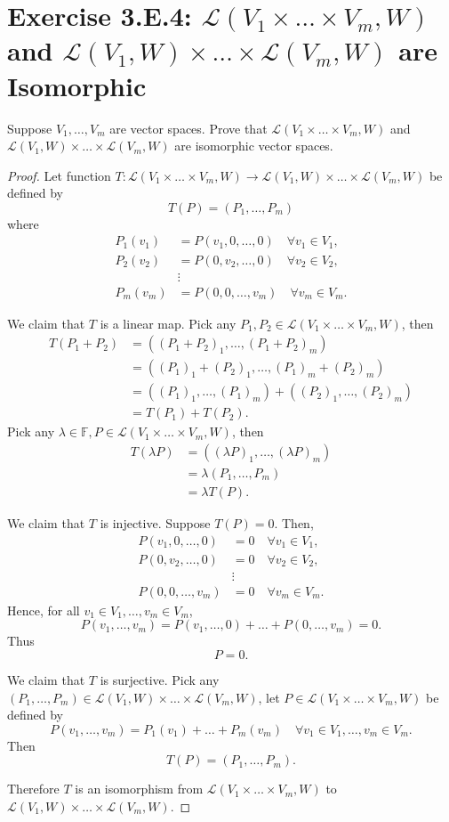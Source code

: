 \section{Exercise 3.E.4: $\mathcal{L}(V_1\times\dots\times V_m,W)$ and $\mathcal{L}(V_1, W)\times\dots\times\mathcal{L}(V_m,W)$ are Isomorphic}
Suppose $V_1,\dots,V_m$ are vector spaces. Prove that $\mathcal{L}(V_1\times\dots\times V_m,W)$ and $\mathcal{L}(V_1, W)\times\dots\times\mathcal{L}(V_m,W)$ are isomorphic vector spaces.
\begin{proof}
Let function $T:\mathcal{L}(V_1\times\dots\times V_m,W)\to\mathcal{L}(V_1, W)\times\dots\times\mathcal{L}(V_m,W)$ be defined by\[
T(P)=(P_1,\dots,P_m)
\]where\[
\begin{split}
P_1(v_1)&=P(v_1,0,\dots,0)\quad\forall v_1\in V_1,\\
P_2(v_2)&=P(0,v_2,\dots,0)\quad\forall v_2\in V_2,\\
&\vdots\\
P_m(v_m)&=P(0,0,\dots,v_m)\quad\forall v_m\in V_m.
\end{split}
\]

We claim that $T$ is a linear map. Pick any $P_1,P_2\in\mathcal{L}(V_1\times\dots\times V_m,W)$, then\[
\begin{split}
T(P_1+P_2)&=((P_1+P_2)_1,\dots,(P_1+P_2)_m)\\
&=((P_1)_1+(P_2)_1,\dots,(P_1)_m+(P_2)_m)\\
&=((P_1)_1,\dots,(P_1)_m) + ((P_2)_1,\dots,(P_2)_m)\\
&=T(P_1)+T(P_2).
\end{split}
\]Pick any $\lambda\in\mathbb{F}, P\in\mathcal{L}(V_1\times\dots\times V_m,W)$, then\[
\begin{split}
T(\lambda P)&=((\lambda P)_1,\dots,(\lambda P)_m)\\
&=\lambda(P_1,\dots,P_m)\\
&=\lambda T(P).
\end{split}
\]

We claim that $T$ is injective. Suppose $T(P)=0$. Then,\[
\begin{split}
P(v_1,0,\dots,0)&=0\quad\forall v_1\in V_1,\\
P(0,v_2,\dots,0)&=0\quad\forall v_2\in V_2,\\
&\vdots\\
P(0,0,\dots,v_m)&=0\quad\forall v_m\in V_m.
\end{split}
\]Hence, for all $v_1\in V_1, \dots, v_m\in V_m$, \[
P(v_1,\dots,v_m)=P(v_1,\dots,0)+\dots+P(0,\dots,v_m)=0.
\]Thus\[
P=0.
\]

We claim that $T$ is surjective. Pick any $(P_1,\dots,P_m)\in\mathcal{L}(V_1, W)\times\dots\times\mathcal{L}(V_m,W)$, let $P\in\mathcal{L}(V_1\times\dots\times V_m,W)$ be defined by\[
P(v_1,\dots,v_m)=P_1(v_1)+\dots+P_m(v_m)\quad\forall v_1\in V_1, \dots, v_m\in V_m.
\]Then\[
T(P)=(P_1,\dots,P_m).
\]

Therefore $T$ is an isomorphism from $\mathcal{L}(V_1\times\dots\times V_m,W)$ to $\mathcal{L}(V_1, W)\times\dots\times\mathcal{L}(V_m,W)$.
\end{proof}
